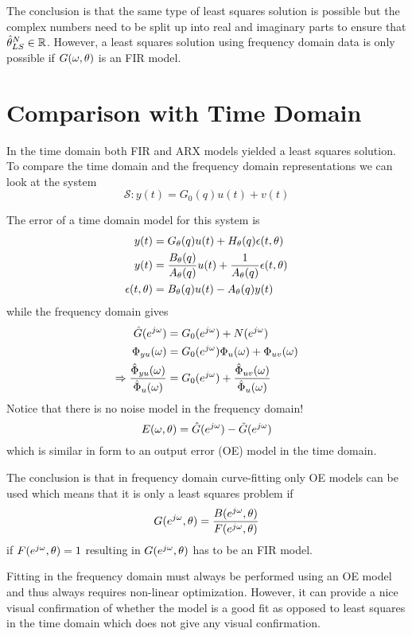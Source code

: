 The conclusion is that the same type of least squares solution is possible but the complex numbers need to be split up into real and imaginary parts to ensure that $\hat{\theta}_{LS}^N\in\mathbb{R}$. However, a least squares solution using frequency domain data is only possible if $G(\omega,\theta)$ is an FIR model.

\section{Comparison with Time Domain}
In the time domain both FIR and ARX models yielded a least squares solution. To compare the time domain and the frequency domain representations we can look at the system
$$\mathcal{S}: y(t) = G_0(q)u(t) + v(t)$$

The error of a time domain model for this system is
\begin{align*}
y(t) &= G_\theta(q) u(t)+H_\theta(q)\epsilon(t,\theta) \\
y(t) &= \frac{B_\theta(q)}{A_\theta(q)}u(t) + \frac{1}{A_\theta(q)}\epsilon(t,\theta) \\
\epsilon(t,\theta) &= B_\theta(q)u(t) - A_\theta(q)y(t)
\end{align*}
while the frequency domain gives
\begin{align*}
\hat{G}(e^{j\omega}) &= G_0(e^{j\omega}) + N(e^{j\omega}) \\
\Phi_{yu}(\omega) &= G_0(e^{j\omega})\Phi_u(\omega) + \Phi_{uv}(\omega) \\
\Rightarrow \frac{\hat{\Phi}_{yu}(\omega)}{\hat{\Phi}_u(\omega)} &= G_0(e^{j\omega}) + \frac{\hat{\Phi}_{uv}(\omega)}{\hat{\Phi}_u(\omega)}
\end{align*}
Notice that there is no noise model in the frequency domain!
$$E(\omega,\theta) = \hat{G}(e^{j\omega}) - \tilde{G}(e^{j\omega})$$
which is similar in form to an output error (OE) model in the time domain.

The conclusion is that in frequency domain curve-fitting only OE models can be used which means that it is only a least squares problem if
$$G(e^{j\omega},\theta) = \frac{B(e^{j\omega},\theta)}{F(e^{j\omega},\theta)}$$
if $F(e^{j\omega},\theta) = 1$ resulting in $G(e^{j\omega},\theta)$ has to be an FIR model.

Fitting in the frequency domain must always be performed using an OE model and thus always requires non-linear optimization. However, it can provide a nice visual confirmation of whether the model is a good fit as opposed to least squares in the time domain which does not give any visual confirmation.

